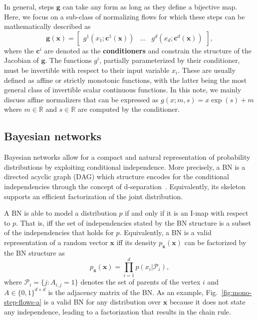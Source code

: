 \documentclass{article}
\newcommand{\mb}{\boldsymbol}
\newcommand{\tbf}[1]{\textbf{#1}}
\newcommand{\figref}[1]{Fig.~\ref{#1}}
\begin{document}
In general, steps $\mb{g}$ can take any form as long as they define a bijective map. Here, we focus on a sub-class of normalizing flows for which these steps can be mathematically described as 
\begin{equation*}
    \mb{g}(\mb{x}) = \begin{bmatrix}
g^1(x_{1}; \mb{c}^1(\mb{x})) & \hdots & g^d(x_{d}; \mb{c}^d(\mb{x}))
\end{bmatrix},\label{eq:gnf}
\end{equation*}
where the $\mb{c}^i$ are denoted as the \tbf{conditioners} and constrain the structure of the Jacobian of $\mb{g}$. The functions $g^i$, partially parameterized by their conditioner, must be invertible with respect to their input variable $x_i$. These are usually defined as affine or strictly monotonic functions, with the latter being the most general class of invertible scalar continuous functions. 
In this note, we mainly discuss affine normalizers that can be expressed as 
$g(x;m, s) = x\exp(s) + m$
where $m \in \mathbb{R}$ and $s \in \mathbb{R}$ are computed by the conditioner.



\subsection{Bayesian networks}

Bayesian networks allow for a compact and natural representation of probability distributions by exploiting conditional independence. More precisely, a BN is a directed acyclic graph (DAG) which structure encodes for the conditional independencies through the concept of d-separation~\citep{d-separation}. Equivalently, its skeleton supports an efficient factorization of the joint distribution. 

A BN is able to model a distribution $p$ if and only if it is an I-map with respect to $p$. That is, iff the set of independencies stated by the BN structure is a subset of the independencies that holds for $p$. Equivalently, a BN is a valid representation of a random vector $\mb{x}$ iff its density $p_{\mb{x}}(\mb{x})$ can be factorized by the BN structure as 
\begin{equation}
    p_{\mb{x}}(\mb{x}) = \prod^d_{i=1}p(x_i|\mathcal{P}_i),\label{eq:BN-fact}
\end{equation} 
where  $\mathcal{P}_i = \{j: A_{i,j} = 1 \}$ denotes the set of parents of the vertex $i$ and $A \in \{0, 1\}^{d\times d}$ is the adjacency matrix of the BN. As an example, \figref{fig:mono-step-flows-a} is a valid BN for any distribution over $\mb{x}$ because it does not state any independence, leading to a factorization that results in the chain rule. 
\end{document}

